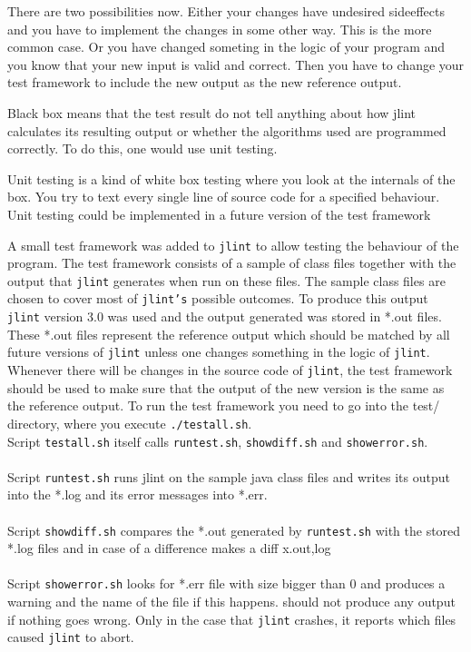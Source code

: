 \documentclass[11pt,twoside,a4paper,draft]{article}
\begin{document}
There are two possibilities now. Either your changes have undesired
sideeffects and you have to implement the changes in some other 
way. This is the more common case. Or you have changed someting
in the logic of your program and you know that your new input is
valid and correct. Then you have to change your test framework
to include the new output as the new reference output.


Black box means that the test result do not tell anything about how
jlint calculates its resulting output or whether the algorithms used
are programmed correctly. To do this, one would use unit testing.

Unit testing is a kind of white box testing where you look at the internals
of the box. You try to text every single line of source code for a
specified behaviour. Unit testing could be implemented in a future version
of the test framework 


A small test framework was added to \texttt{jlint} to allow testing the
behaviour of the program. The test framework consists of a sample of class
files together with the output that \texttt{jlint} generates when run on these
files. The sample class files are chosen to cover most of \texttt{jlint's}
possible outcomes. To produce this output \texttt{jlint} version 3.0 was used
and the output generated was stored in *.out files. These *.out files 
represent the reference output which should be matched by all future versions
of \texttt{jlint} unless one changes something in the logic of \texttt{jlint}.
Whenever there will be changes in the source code of \texttt{jlint}, the test
framework should be used to make sure that the output of the new version is 
the same as the reference output. To run the test framework you need to go
into the test/ directory, where you execute \texttt{./testall.sh}.
\\Script \texttt{testall.sh} itself calls \texttt{runtest.sh}, 
\texttt{show\-diff.sh} and \texttt{showerror.sh}.
\\\\Script \texttt{runtest.sh}
runs jlint on the sample java class files and writes its output into the 
*.log and its error messages into *.err.
\\\\Script \texttt{showdiff.sh}
compares the *.out generated by \texttt{runtest.sh} with the stored *.log
files and in case of a difference makes a diff x.{out,log}
\\\\Script \texttt{showerror.sh}
looks for *.err file with size bigger than 0 and produces a warning and the 
name of the file if this happens.
should not produce any output if nothing goes wrong. Only in the case that 
\texttt{jlint} crashes, it reports which files caused \texttt{jlint} to abort.
\end{document}
